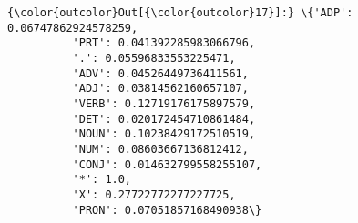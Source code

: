 \documentclass[11pt]{article}
\begin{document}
\begin{Verbatim}[commandchars=\\\{\}]
{\color{outcolor}Out[{\color{outcolor}17}]:} \{'ADP': 0.06747862924578259,
          'PRT': 0.041392285983066796,
          '.': 0.05596833553225471,
          'ADV': 0.04526449736411561,
          'ADJ': 0.03814562160657107,
          'VERB': 0.12719176175897579,
          'DET': 0.020172454710861484,
          'NOUN': 0.10238429172510519,
          'NUM': 0.08603667136812412,
          'CONJ': 0.014632799558255107,
          '*': 1.0,
          'X': 0.27722772277227725,
          'PRON': 0.07051857168490938\}
\end{Verbatim}
            

    
    
    
    
\end{document}
